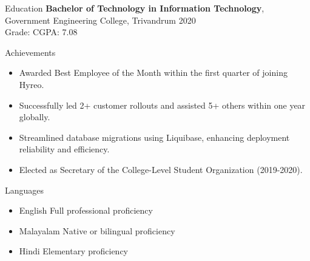 \documentclass{resume} %
\begin{document}
\begin{rSection}{Education}
{\bf Bachelor of Technology in Information Technology}, Government Engineering College, Trivandrum \hfill {2020}\\
{Grade: CGPA: 7.08}
\end{rSection}

\begin{rSection}{Achievements}
\begin{itemize}
    \itemsep -0.3em
    \item Awarded Best Employee of the Month within the first quarter of joining Hyreo.
    \item Successfully led 2+ customer rollouts and assisted 5+ others within one year globally.
    \item Streamlined database migrations using Liquibase, enhancing deployment reliability and efficiency.
    \item Elected as Secretary of the College-Level Student Organization (2019-2020).
\end{itemize}
\end{rSection}

\begin{rSection}{Languages}
\begin{itemize}
    \itemsep -0.3em
    \item English \hfill {Full professional proficiency}
    \item Malayalam \hfill {Native or bilingual proficiency}
    \item Hindi \hfill {Elementary proficiency}
\end{itemize}
\end{rSection}
\end{document}
